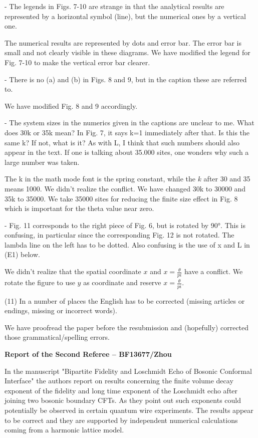 \documentclass{article}
\newcommand{\reply}[1]{{\color{black}#1}}
\begin{document}
- The legends in Figs. 7-10 are strange in that the analytical results are represented by a horizontal symbol (line), but the numerical ones by a vertical one.

\reply{The numerical results are represented by dots and error bar. The error bar is small and not clearly visible in these diagrams. We have modified the legend for Fig. 7-10 to make the vertical error bar clearer.}

- There is no (a) and (b) in Figs. 8 and 9, but in the caption these are referred to.

\reply{We have modified Fig. 8 and 9 accordingly.}

- The system sizes in the numerics given in the captions are unclear to me. What does 30k or 35k mean? In Fig. 7, it says k=1 immediately after that. Is this the same k? If not, what is it? As with L, I think that such numbers should also appear in the text. If one is talking about 35.000 sites, one wonders why such a large number was taken.

\reply{The k in the math mode font is the spring constant, while the $k$ after 30 and 35 means 1000. We didn't realize the conflict. We have changed 30k to 30000 and 35k to 35000. We take 35000 sites for reducing the finite size effect in Fig. 8 which is important for the theta value near zero. 

- Fig. 11 corresponds to the right piece of Fig. 6, but is rotated by 90°. This is confusing, in particular since the corresponding Fig. 12 is not rotated. The lambda line on the left has to be dotted. Also confusing is the use of x and L in (E1) below.

We didn't realize that the spatial coordinate $x$ and $x = \frac{\theta}{pi}$ have a conflict. We rotate the figure to use $y$ as coordinate and reserve $x = \frac{\theta}{pi}$. }
 
(11) In a number of places the English has to be corrected (missing articles or endings, missing or incorrect words).

\reply{We have proofread the paper before the resubmission and (hopefully) corrected those grammatical/spelling errors.}




{\bf \color{black} Report of the Second Referee -- BF13677/Zhou}

In the manuscript "Bipartite Fidelity and Loschmidt Echo of Bosonic Conformal Interface" the authors report on results concerning the finite volume decay exponent of the fidelity and long time exponent of the Loschmidt echo after joining two bosonic boundary CFTs. As they point out such exponents could potentially be observed in certain quantum wire experiments. The results appear to be correct and they are supported by independent numerical calculations coming from a harmonic lattice model.
\end{document}
